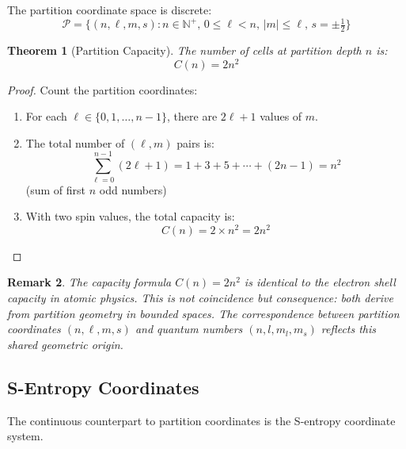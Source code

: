 \documentclass[twocolumn,10pt,twoside]{article}
\newtheorem{theorem}{Theorem}[section]
\newtheorem{remark}[theorem]{Remark}
\newcommand{\N}{\mathbb{N}}
\newcommand{\Part}{\mathcal{P}}
\begin{document}
The partition coordinate space is discrete:
\begin{equation}
\Part = \{(n, \ell, m, s) : n \in \N^+, \, 0 \leq \ell < n, \, |m| \leq \ell, \, s = \pm\tfrac{1}{2}\}
\end{equation}

\begin{theorem}[Partition Capacity]
\label{thm:capacity}
The number of cells at partition depth $n$ is:
\begin{equation}
C(n) = 2n^2
\label{eq:capacity}
\end{equation}
\end{theorem}

\begin{proof}
Count the partition coordinates:
\begin{enumerate}
    \item For each $\ell \in \{0, 1, \ldots, n-1\}$, there are $2\ell + 1$ values of $m$.
    \item The total number of $(\ell, m)$ pairs is:
    \begin{equation}
    \sum_{\ell=0}^{n-1} (2\ell + 1) = 1 + 3 + 5 + \cdots + (2n-1) = n^2
    \end{equation}
    (sum of first $n$ odd numbers)
    \item With two spin values, the total capacity is:
    \begin{equation}
    C(n) = 2 \times n^2 = 2n^2
    \end{equation}
\end{enumerate}
\end{proof}

\begin{remark}
The capacity formula $C(n) = 2n^2$ is identical to the electron shell capacity in atomic physics. This is not coincidence but consequence: both derive from partition geometry in bounded spaces. The correspondence between partition coordinates $(n, \ell, m, s)$ and quantum numbers $(n, l, m_l, m_s)$ reflects this shared geometric origin.
\end{remark}

\subsection{S-Entropy Coordinates}

The continuous counterpart to partition coordinates is the S-entropy coordinate system.
\end{document}
